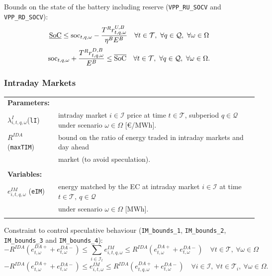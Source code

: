 Bounds on the state of the battery including reserve (\verb|VPP_RU_SOCV| and  \verb|VPP_RD_SOCV|):
\begin{equation} \label{EQ:VPP_RU_SOCV2}
	\underline{\text{SoC}} \leq \text{soc}_{t,q, \omega} - \frac{T^R r^{U, B}_{t,q, \omega}}{\eta^B E^B} \quad \forall t \in \mathcal{T}, \ \forall q \in \mathcal{Q}, \ \forall \omega \in \Omega
\end{equation}
\begin{equation} \label{EQ:VPP_RD_SOCV2}
	\text{soc}_{t,q, \omega} + \frac{T^R r^{D, B}_{t,q, \omega} }{E^B} \leq \overline{\text{SoC}} \quad \forall t \in \mathcal{T}, \ \forall q \in \mathcal{Q}, \ \forall \omega \in \Omega.
\end{equation}

\subsubsection{Intraday Markets}

\begin{tabularx}{\textwidth}{l X}
    
    \textbf{Parameters:} \\
    	$\lambda^I_{i, t,q, \omega}$(\texttt{lI}) & intraday market $i \in \mathcal{I}$ price at time $t \in \mathcal{T}$, subperiod $q \in \mathcal{Q}$ under scenario $\omega \in \Omega$ [\euro/MWh]. \\
	$R^{IDA}$ (\texttt{maxTIM}) & bound on the ratio of energy traded in intraday markets and day ahead \\
	& market (to avoid speculation).\\
    \\ 
       
    \textbf{Variables:} \\
    $e^{IM}_{i, t, q, \omega}$ (\texttt{eIM}) & energy matched by the EC at intraday market $i \in \mathcal{I}$ at time $t \in \mathcal{T}, \  q \in \mathcal{Q}$ \\
    & under scenario $\omega \in \Omega$ [MWh]. \\
	\\
\end{tabularx}

Constraint to control speculative behaviour (\verb|IM_bounds_1|, \verb|IM_bounds_2|, \verb|IM_bounds_3| and \verb|IM_bounds_4|):
\begin{equation} \label{EQ:DM_IM_12}
	-R^{IDA} (e^{DA+}_{t, \omega} + e^{DA-}_{t, \omega})  \leq \sum_{i \in \mathcal{I}_t} e^{IM}_{i, t, q, \omega} \leq R^{IDA} (e^{DA+}_{t, \omega} + e^{DA-}_{t, \omega}) \quad \forall t \in \mathcal{T}, \ \forall \omega \in \Omega
\end{equation}
\begin{equation} \label{EQ:IM_bounds_3-42}
	-R^{IDA} (e^{DA+}_{t, \omega} + e^{DA-}_{t, \omega}) \leq e^{IM}_{i, t, \omega} \leq R^{IDA} (e^{DA+}_{t, q, \omega} + e^{DA-}_{t, \omega}) \quad \forall i \in \mathcal{I}, \ \forall t \in \mathcal{T}_i, \ \forall \omega \in \Omega.
\end{equation}


